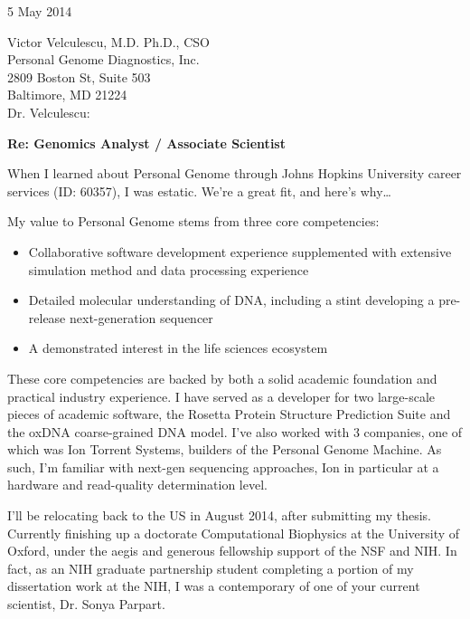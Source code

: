 \documentclass{../res}
\begin{document}
 
\begin{sloppypar}
 
%


\begin{resume} 
 
5 May 2014

Victor Velculescu, M.D. Ph.D., CSO \\
Personal Genome Diagnostics, Inc. \\
2809 Boston St, Suite 503 \\
Baltimore, MD 21224 \\

Dr. Velculescu:

\textbf{Re: Genomics Analyst / Associate Scientist}

When I learned about Personal Genome through Johns Hopkins University career services (ID: 60357), I was estatic. We're a great fit, and here's why\ldots

My value to Personal Genome stems from three core competencies: 
\begin{itemize}[itemindent=1cm]
    \item Collaborative software development experience supplemented with extensive simulation method and data processing experience
    \item Detailed molecular understanding of DNA, including a stint developing a pre-release next-generation sequencer
    \item A demonstrated interest in the life sciences ecosystem
\end{itemize}

These core competencies are backed by both a solid academic foundation and practical industry experience. I have served as a developer for two large-scale pieces of academic software, the Rosetta Protein Structure Prediction Suite and the oxDNA coarse-grained DNA model. I've also worked with 3 companies, one of which was Ion Torrent Systems, builders of the Personal Genome Machine. As such, I'm familiar with next-gen sequencing approaches, Ion in particular at a hardware and read-quality determination level. 

I'll be relocating back to the US in August 2014, after submitting my thesis. Currently finishing up a doctorate Computational Biophysics at the University of Oxford, under the aegis and generous fellowship support of the NSF and NIH. In fact, as an NIH graduate partnership student completing a portion of my dissertation work at the NIH, I was a contemporary of one of your current scientist, Dr. Sonya Parpart.


\end{resume}
\end{sloppypar}
\end{document}
